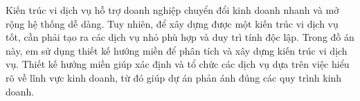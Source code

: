 Kiến trúc vi dịch vụ hỗ trợ doanh nghiệp chuyển đổi kinh doanh nhanh và mở rộng hệ thống dễ dàng. Tuy nhiên, để xây dựng được một kiến trúc vi dịch vụ tốt, cần phải tạo ra các dịch vụ nhỏ phù hợp và duy trì tính độc lập. Trong đồ án này, em sử dụng thiết kế hướng miền để phân tích và xây dựng kiến trúc vi dịch vụ. Thiết kế hướng miền giúp xác định và tổ chức các dịch vụ dựa trên việc hiểu rõ về lĩnh vực kinh doanh, từ đó giúp dự án phản ánh đúng các quy trình kinh doanh.